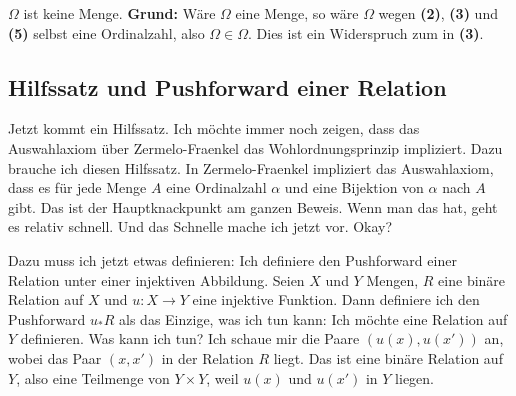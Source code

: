 \begin{math-stroke}

\begin{remark}
$\Omega$ ist keine Menge.
\textbf{Grund:} Wäre $\Omega$ eine Menge, so wäre $\Omega$ wegen \textbf{(2)}, \textbf{(3)} und \textbf{(5)} selbst eine Ordinalzahl, also $\Omega \in \Omega$. Dies ist ein Widerspruch zum  in \textbf{(3)}.
\end{remark}
\end{math-stroke}

\subsection{Hilfssatz und Pushforward einer Relation}

\begin{spoken-clean}[00:39:25 - 00:40:50]
Jetzt kommt ein Hilfssatz. Ich möchte immer noch zeigen, dass das Auswahlaxiom über Zermelo-Fraenkel das Wohlordnungsprinzip impliziert. Dazu brauche ich diesen Hilfssatz. In Zermelo-Fraenkel impliziert das Auswahlaxiom, dass es für jede Menge $A$ eine Ordinalzahl $\alpha$ und eine Bijektion von $\alpha$ nach $A$ gibt. Das ist der Hauptknackpunkt am ganzen Beweis. Wenn man das hat, geht es relativ schnell. Und das Schnelle mache ich jetzt vor. Okay?

Dazu muss ich jetzt etwas definieren: Ich definiere den Pushforward einer Relation unter einer injektiven Abbildung. Seien $X$ und $Y$ Mengen, $R$ eine binäre Relation auf $X$ und $u: X \to Y$ eine injektive Funktion. Dann definiere ich den Pushforward $u_* R$ als das Einzige, was ich tun kann: Ich möchte eine Relation auf $Y$ definieren. Was kann ich tun? Ich schaue mir die Paare $(u(x), u(x'))$ an, wobei das Paar $(x, x')$ in der Relation $R$ liegt. Das ist eine binäre Relation auf $Y$, also eine Teilmenge von $Y \times Y$, weil $u(x)$ und $u(x')$ in $Y$ liegen.
\end{spoken-clean}

